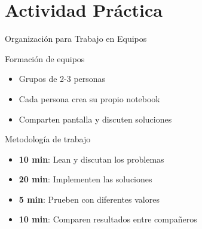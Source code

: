 \documentclass[10pt]{beamer}
\begin{document}
\section{Actividad Práctica}

\begin{frame}{Organización para Trabajo en Equipos}
  \begin{block}{Formación de equipos}
    \begin{itemize}
      \item Grupos de 2-3 personas
      \item Cada persona crea su propio notebook
      \item Comparten pantalla y discuten soluciones
    \end{itemize}
  \end{block}
  
  \begin{block}{Metodología de trabajo}
    \begin{itemize}
      \item \textbf{10 min}: Lean y discutan los problemas
      \item \textbf{20 min}: Implementen las soluciones
      \item \textbf{5 min}: Prueben con diferentes valores
      \item \textbf{10 min}: Comparen resultados entre compañeros
    \end{itemize}
  \end{block}
\end{frame}
\end{document}
